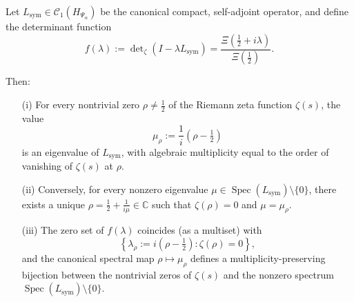 \begin{lemma}
\label{lem:fredholm_zero_spectral_map}
Let \( L_{\mathrm{sym}} \in \mathcal{C}_1(H_{\Psi_\alpha}) \) be the canonical compact, self-adjoint operator, and define the determinant function
\[
f(\lambda) := \det\nolimits_\zeta(I - \lambda L_{\mathrm{sym}}) = \frac{\Xi\left( \tfrac{1}{2} + i\lambda \right)}{\Xi\left( \tfrac{1}{2} \right)}.
\]

Then:
\begin{enumerate}
  \item[\textnormal{(i)}] For every nontrivial zero \( \rho \ne \tfrac{1}{2} \) of the Riemann zeta function \( \zeta(s) \), the value
  \[
  \mu_\rho := \frac{1}{i}(\rho - \tfrac{1}{2})
  \]
  is an eigenvalue of \( L_{\mathrm{sym}} \), with algebraic multiplicity equal to the order of vanishing of \( \zeta(s) \) at \( \rho \).

  \item[\textnormal{(ii)}] Conversely, for every nonzero eigenvalue \( \mu \in \operatorname{Spec}(L_{\mathrm{sym}}) \setminus \{0\} \), there exists a unique \( \rho = \tfrac{1}{2} + \frac{1}{i\mu} \in \mathbb{C} \) such that \( \zeta(\rho) = 0 \) and \( \mu = \mu_\rho \).

  \item[\textnormal{(iii)}] The zero set of \( f(\lambda) \) coincides (as a multiset) with
  \[
  \left\{ \lambda_\rho := i(\rho - \tfrac{1}{2}) : \zeta(\rho) = 0 \right\},
  \]
  and the canonical spectral map \( \rho \mapsto \mu_\rho \) defines a multiplicity-preserving bijection between the nontrivial zeros of \( \zeta(s) \) and the nonzero spectrum \( \operatorname{Spec}(L_{\mathrm{sym}}) \setminus \{0\} \).
\end{enumerate}
\end{lemma}
